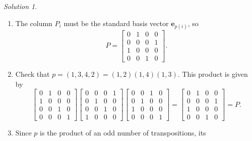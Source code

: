 \documentclass[11pt]{report}
\renewcommand\vec\boldsymbol
\def\ve{\vec{e}}
\theoremstyle{remark}
\newtheorem*{solution}{Solution}
\begin{document}
    \begin{solution}
        \mbox{}
        \begin{enumerate}
            \itemsep0em
            \item The column $P_i$ must be the standard basis vector $\ve_{p(i)}$, so
            \[
                P = \begin{bmatrix}
                    0 & 1 & 0 & 0 \\
                    0 & 0 & 0 & 1 \\
                    1 & 0 & 0 & 0 \\
                    0 & 0 & 1 & 0 
                \end{bmatrix}.
            \] 
            \item Check that $p = (1, 3, 4, 2) = (1, 2)(1, 4)(1, 3)$. This product
            is given by \[
                \begin{bmatrix}
                    0 & 1 & 0 & 0 \\
                    1 & 0 & 0 & 0 \\
                    0 & 0 & 1 & 0 \\
                    0 & 0 & 0 & 1
                \end{bmatrix}
                \begin{bmatrix}
                    0 & 0 & 0 & 1 \\
                    0 & 1 & 0 & 0 \\
                    0 & 0 & 1 & 0 \\
                    1 & 0 & 0 & 0
                \end{bmatrix}
                \begin{bmatrix}
                    0 & 0 & 1 & 0 \\
                    0 & 1 & 0 & 0 \\
                    1 & 0 & 0 & 0 \\
                    0 & 0 & 0 & 1
                \end{bmatrix}
                = \begin{bmatrix}
                    0 & 1 & 0 & 0 \\
                    0 & 0 & 0 & 1 \\
                    1 & 0 & 0 & 0 \\
                    0 & 0 & 1 & 0 
                \end{bmatrix}
                = P.
            \] 
            \item Since $p$ is the product of an odd number of transpositions, its

\end{enumerate}
\end{solution}
\end{document}
